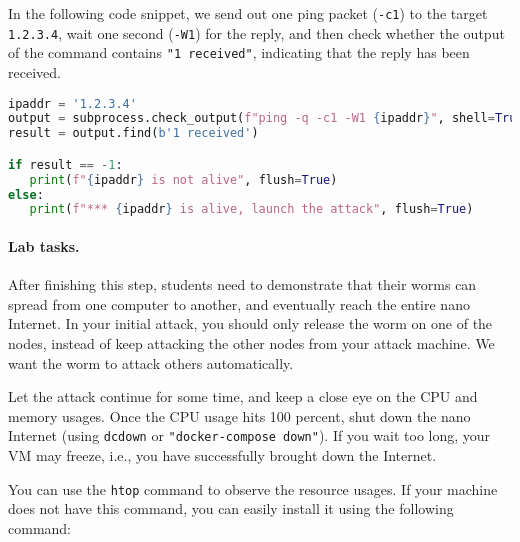 In the following code snippet, we send out one ping packet (\texttt{-c1}) 
to the target \texttt{1.2.3.4}, wait one second (\texttt{-W1})  
for the reply, and then check whether the
output of the command contains \texttt{"1 received"}, indicating
that the reply has been received. 



\begin{lstlisting}[language=Python]
ipaddr = '1.2.3.4'
output = subprocess.check_output(f"ping -q -c1 -W1 {ipaddr}", shell=True)
result = output.find(b'1 received')

if result == -1:
   print(f"{ipaddr} is not alive", flush=True)
else:
   print(f"*** {ipaddr} is alive, launch the attack", flush=True)
\end{lstlisting}
 
 



\paragraph{Lab tasks.}
After finishing this step, students need to demonstrate that their worms can 
spread from one computer to another, and eventually reach the entire 
nano Internet. In your initial attack, you should only release the worm 
on one of the nodes, instead of keep
attacking the other nodes from your attack machine. We want the 
worm to attack others automatically. 

Let the attack continue for some time, and keep a close eye 
on the CPU and memory usages. Once the CPU usage hits 100
percent, shut down the nano Internet (using \texttt{dcdown} or
\texttt{"docker-compose down"}). If you wait too long, your VM
may freeze, i.e., you have successfully brought down the Internet. 

You can use the \texttt{htop} command to observe the resource usages. If
your machine does not have this command, you can easily install it 
using the following command:


